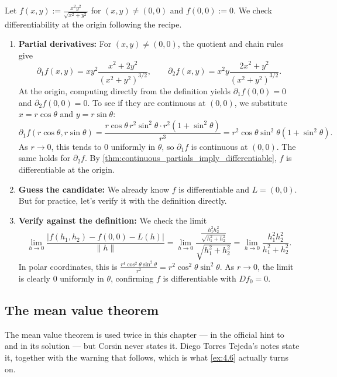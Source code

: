 \begin{example}
\label{ex:differentiability_recipe_positive}
Let $f(x,y) := \frac{x^2 y^2}{\sqrt{x^2+y^2}}$ for $(x,y) \neq (0,0)$ and $f(0,0) := 0$. We check differentiability at the origin following the recipe.
\begin{enumerate}[label=\textbf{\arabic*.}]
  \item \textbf{Partial derivatives:} For $(x,y) \neq (0,0)$, the quotient and chain rules give
    \[\partial_1 f(x,y) = xy^2\frac{x^2+2y^2}{(x^2+y^2)^{3/2}}, \qquad \partial_2 f(x,y) = x^2y\frac{2x^2+y^2}{(x^2+y^2)^{3/2}}.\]
    At the origin, computing directly from the definition yields $\partial_1 f(0,0) = 0$ and $\partial_2 f(0,0) = 0$.
    To see if they are continuous at $(0,0)$, we substitute $x = r\cos\theta$ and $y = r\sin\theta$:
    \[\partial_1 f(r\cos\theta, r\sin\theta) = \frac{r\cos\theta\,r^2\sin^2\theta \cdot r^2(1+\sin^2\theta)}{r^3} = r^2\cos\theta\sin^2\theta(1+\sin^2\theta).\]
    As $r \to 0$, this tends to $0$ uniformly in $\theta$, so $\partial_1 f$ is continuous at $(0,0)$. The same holds for $\partial_2 f$. By \cref{thm:continuous_partials_imply_differentiable}, $f$ is differentiable at the origin.
  \item \textbf{Guess the candidate:} We already know $f$ is differentiable and $L = (0,0)$. But for practice, let's verify it with the definition directly.
  \item \textbf{Verify against the definition:} We check the limit
    \[\lim_{h\to 0} \frac{|f(h_1,h_2) - f(0,0) - L(h)|}{\lVert h\rVert} = \lim_{h\to 0} \frac{\frac{h_1^2 h_2^2}{\sqrt{h_1^2+h_2^2}}}{\sqrt{h_1^2+h_2^2}} = \lim_{h\to 0} \frac{h_1^2 h_2^2}{h_1^2+h_2^2}.\]
    In polar coordinates, this is $\frac{r^4\cos^2\theta\sin^2\theta}{r^2} = r^2\cos^2\theta\sin^2\theta$. As $r \to 0$, the limit is clearly $0$ uniformly in $\theta$, confirming $f$ is differentiable with $Df_0 = 0$.
\end{enumerate}
\end{example}

\subsection{The mean value theorem}
\label{sec:mean_value_theorem}

\begin{ainote}
The mean value theorem is used twice in this chapter --- in the official hint to
 and in its solution --- but Corsin never states it. Diego Torres Tejeda's notes
state it, together with the warning that follows, which is what \cref{ex:4.6} actually turns on.
\end{ainote}


